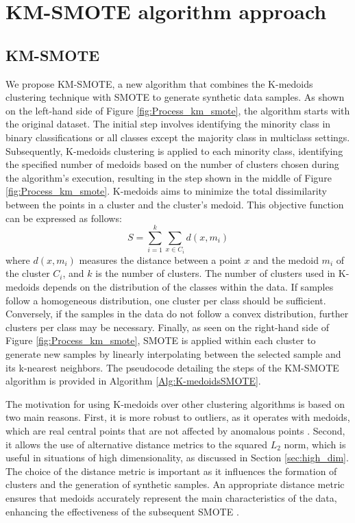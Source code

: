 \documentclass[12pt]{book}
\begin{document}
\chapter{KM-SMOTE algorithm approach} \label{sec:proposed_method}


\section{KM-SMOTE} 


We propose KM-SMOTE, a new algorithm that combines the K-medoids clustering technique with SMOTE to generate synthetic data samples. As shown on the left-hand side of Figure \cref{fig:Process_km_smote}, the algorithm starts with the original dataset. The initial step involves identifying the minority class in binary classifications or all classes except the majority class in multiclass settings. Subsequently, K-medoids clustering is applied to each minority class, identifying the specified number of medoids based on the number of clusters chosen during the algorithm's execution, resulting in the step shown in the middle of Figure \cref{fig:Process_km_smote}. K-medoids aims to minimize the total dissimilarity between the points in a cluster and the cluster's medoid. This objective function can be expressed as follows:
\begin{equation}
S = \sum_{i=1}^{k} \sum_{x \in C_i} d(x, m_i)
\end{equation}
where $d(x, m_i)$ measures the distance between a point $x$ and the medoid $m_i$ of the cluster $C_i$, and $k$ is the number of clusters. The number of clusters used in K-medoids depends on the distribution of the classes within the data. If samples follow a homogeneous distribution, one cluster per class should be sufficient. Conversely, if the samples in the data do not follow a convex distribution, further clusters per class may be necessary. Finally, as seen on the right-hand side of Figure \cref{fig:Process_km_smote}, SMOTE is applied within each cluster to generate new samples by linearly interpolating between the selected sample and its k-nearest neighbors. The pseudocode detailing the steps of the KM-SMOTE algorithm is provided in Algorithm \ref{Alg:K-medoidsSMOTE}.

The motivation for using K-medoids over other clustering algorithms is based on two main reasons. First, it is more robust to outliers, as it operates with medoids, which are real central points that are not affected by anomalous points \citep{kaur2014k}. Second, it allows the use of alternative distance metrics to the squared $L_2$ norm, which is useful in situations of high dimensionality, as discussed in Section \ref{sec:high_dim}. The choice of the distance metric is important as it influences the formation of clusters and the generation of synthetic samples. An appropriate distance metric ensures that medoids accurately represent the main characteristics of the data, enhancing the effectiveness of the subsequent SMOTE \citep{aggarwal2001surprising}.
\end{document}
